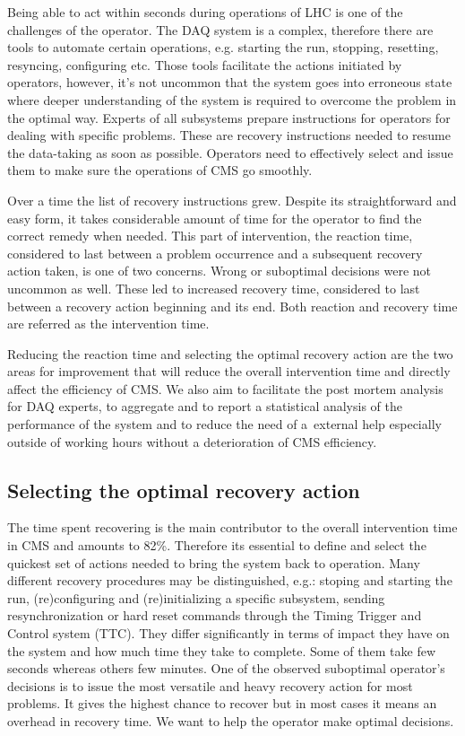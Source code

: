 \documentclass[a4paper]{jpconf}
\begin{document}
Being able to act within seconds during operations of LHC is one of the challenges of the operator. The DAQ system is a complex, therefore there are tools to automate certain operations, e.g. starting the run, stopping, resetting, resyncing, configuring etc. Those tools facilitate the actions initiated by operators, however, it's not uncommon that the system goes into erroneous state where deeper understanding of the system is required to overcome the problem in the optimal way. Experts of all subsystems prepare instructions for operators for dealing with specific problems. These are recovery instructions needed to resume the data-taking as soon as possible. Operators need to effectively select and issue them to make sure the operations of CMS go smoothly.

Over a time the list of recovery instructions grew. Despite its straightforward and easy form, it takes considerable amount of time for the operator to find the correct remedy when needed. This part of intervention, the reaction time, considered to last between a problem occurrence and a subsequent recovery action taken, is one of two concerns. Wrong or suboptimal decisions were not uncommon as well. These led to increased recovery time, considered to last between a recovery action beginning and its end. Both reaction and recovery time are referred as the intervention time.

Reducing the reaction time and selecting the optimal recovery action are the two areas for improvement that will reduce the overall intervention time and directly affect the efficiency of CMS. We also aim to facilitate the post mortem analysis for DAQ experts, to aggregate and to report a statistical analysis of the performance of the system and to reduce the need of a~external help especially outside of working hours without a deterioration of CMS efficiency. 

\subsection{Selecting the optimal recovery action}
The time spent recovering is the main contributor to the overall intervention time in CMS and amounts to 82\%. Therefore its essential to define and select the quickest set of actions needed to bring the system back to operation. Many different recovery procedures may be distinguished, e.g.: stoping and starting the run, (re)configuring and (re)initializing a specific subsystem, sending resynchronization or hard reset commands through the Timing Trigger and Control system (TTC). They differ significantly in terms of impact they have on the system and how much time they take to complete. Some of them take few seconds whereas others few minutes. One of the observed suboptimal operator's decisions is to issue the most versatile and heavy recovery action for most problems. It gives the highest chance to recover but in most cases it means an overhead in recovery time. We want to help the operator make optimal decisions.
\end{document}
